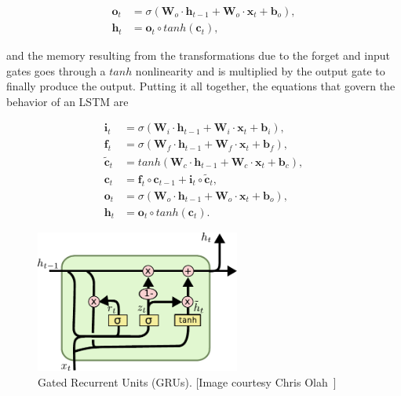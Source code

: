 \begin{equation}\label{eq:LSTM_output_gate}
\begin{split}
\mathbf{o}_t &= \sigma\left(\mathbf{W}_o \cdot \mathbf{h}_{t-1} +
\mathbf{W}_o \cdot \mathbf{x}_t + \mathbf{b}_o \right),\\
\mathbf{h}_t &= \mathbf{o}_t \circ tanh \left(\mathbf{c}_t\right),
\end{split}
\end{equation}

and the memory resulting from the transformations due to the forget and input gates goes through a $tanh$ nonlinearity and is multiplied by the output gate to finally produce the output. Putting it all together, the equations that govern the behavior of an LSTM are

\begin{equation}\label{eq:LSTM}
\begin{split}
\mathbf{i}_t &= \sigma\left(\mathbf{W}_i \cdot \mathbf{h}_{t-1} +
\mathbf{W}_i \cdot \mathbf{x}_t + \mathbf{b}_i \right),\\
\mathbf{f}_t &= \sigma\left(\mathbf{W}_f \cdot \mathbf{h}_{t-1} +
\mathbf{W}_f \cdot \mathbf{x}_t + \mathbf{b}_f \right),\\
\mathbf{\tilde c}_t &= tanh \left(\mathbf{W}_c \cdot \mathbf{h}_{t-1} +
\mathbf{W}_c \cdot \mathbf{x}_t + \mathbf{b}_c \right),\\
\mathbf{c}_t &= \mathbf{f}_t \circ \mathbf{c}_{t-1} + \mathbf{i}_t
\circ \mathbf{\tilde c}_t,\\
\mathbf{o}_t &= \sigma\left(\mathbf{W}_o \cdot \mathbf{h}_{t-1} +
\mathbf{W}_o \cdot \mathbf{x}_t + \mathbf{b}_o \right),\\
\mathbf{h}_t &= \mathbf{o}_t \circ tanh \left(\mathbf{c}_t\right).
\end{split}
\end{equation}


\begin{figure}
	\centering
	\includegraphics[width=0.6\textwidth]{figures/GRU.pdf}
	\caption[Gated Recurrent Units (GRUs)]
	{Gated Recurrent Units (GRUs). [Image courtesy Chris Olah~\cite{colah_15}]\label{fig:GRU}}
\end{figure}

